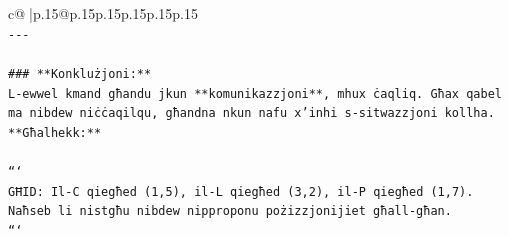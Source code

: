 \documentclass{article}
\begin{document}
{\begin{supertabular}{c@{$\;$}|p{.15\linewidth}@{}p{.15\linewidth}p{.15\linewidth}p{.15\linewidth}p{.15\linewidth}p{.15\linewidth}}
{{{\\ 
\texttt{{-}{-}{-}} \\
\\ 
\texttt{\#\#\# **Konklużjoni:**} \\
\texttt{L{-}ewwel kmand għandu jkun **komunikazzjoni**, mhux ċaqliq. Għax qabel ma nibdew niċċaqilqu, għandna nkun nafu x'inhi s{-}sitwazzjoni kollha. **Għalhekk:**} \\
\\ 
\texttt{```} \\
\texttt{GĦID: Il{-}C qiegħed (1,5), il{-}L qiegħed (3,2), il{-}P qiegħed (1,7). Naħseb li nistgħu nibdew nipproponu pożizzjonijiet għall{-}għan.} \\
\texttt{```} \\
            }
        }
    }
     \\ \\


\end{supertabular}}
\end{document}
